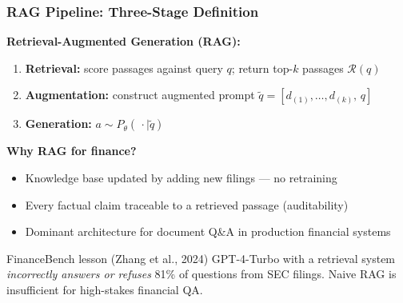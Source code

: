 \documentclass[9pt,t]{beamer}
\begin{document}
\begin{frame}
\frametitle{RAG Pipeline: Three-Stage Definition}

\textbf{Retrieval-Augmented Generation (RAG):}
{\small
\begin{enumerate}
  \item \textbf{Retrieval:} score passages against query $q$; return top-$k$
        passages $\mathcal{R}(q)$
  \item \textbf{Augmentation:} construct augmented prompt
        $\tilde{q} = [d_{(1)},\ldots,d_{(k)},\,q]$
  \item \textbf{Generation:} $a \sim P_\theta(\,\cdot \mid \tilde{q})$
\end{enumerate}
}

\begin{bigpicture}
\textbf{Why RAG for finance?}
{\small
\begin{itemize}
  \item Knowledge base updated by adding new filings — no retraining
  \item Every factual claim traceable to a retrieved passage (auditability)
  \item Dominant architecture for document Q\&A in production financial systems
\end{itemize}
}
\end{bigpicture}

\medskip
\begin{alertblock}{FinanceBench lesson (Zhang et al., 2024)}
GPT-4-Turbo with a retrieval system \emph{incorrectly answers or refuses} 81\% of
questions from SEC filings. Naive RAG is insufficient for high-stakes financial QA.
\end{alertblock}
\end{frame}
\end{document}
